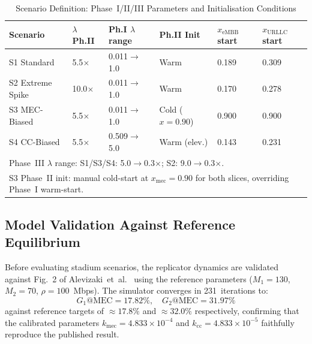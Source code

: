 \documentclass[conference]{IEEEtran}
\begin{document}
\begin{table}[ht]
\centering
\caption{Scenario Definition: Phase~I/II/III Parameters and Initialisation Conditions}
\label{tab:scenario_def}
\renewcommand{\arraystretch}{1.15}
\begin{tabular}{p{1.5cm}p{0.8cm}p{1.3cm}p{1.0cm}p{0.7cm}p{0.7cm}}
\toprule
\textbf{Scenario} & \textbf{$\lambda$ Ph.II} & \textbf{Ph.I $\lambda$ range} &
  \textbf{Ph.II Init} & \textbf{$x_\text{eMBB}$ start} & \textbf{$x_\text{URLLC}$ start} \\
\midrule
S1 Standard       & 5.5$\times$ & 0.011$\to$1.0 & Warm        & 0.189 & 0.309 \\
S2 Extreme Spike  & 10.0$\times$ & 0.011$\to$1.0 & Warm        & 0.170 & 0.278 \\
S3 MEC-Biased     & 5.5$\times$ & 0.011$\to$1.0 & Cold ($x\!=\!0.90$) & 0.900 & 0.900 \\
S4 CC-Biased      & 5.5$\times$ & 0.509$\to$5.0 & Warm (elev.) & 0.143 & 0.231 \\
\bottomrule
\multicolumn{6}{l}{\footnotesize Phase~III $\lambda$ range: S1/S3/S4: 5.0$\to$0.3$\times$;
  S2: 9.0$\to$0.3$\times$.} \\
\multicolumn{6}{l}{\footnotesize S3 Phase~II init: manual cold-start at $x_\text{mec}=0.90$
  for both slices, overriding Phase~I warm-start.} \\
\end{tabular}
\end{table}

\subsection{Model Validation Against Reference Equilibrium}

Before evaluating stadium scenarios, the replicator dynamics
are validated against Fig.~2 of Alevizaki~et~al.~\cite{Alevizaki2021upf}
using the reference parameters ($M_1=130$, $M_2=70$,
$\rho=100$~Mbps). The simulator converges in 231~iterations to:
\begin{equation*}
  G_1\text{@MEC} = 17.82\%,\quad G_2\text{@MEC} = 31.97\%
\end{equation*}
against reference targets of $\approx 17.8\%$ and $\approx 32.0\%$
respectively, confirming that the calibrated parameters
$k_\text{mec} = 4.833\times10^{-4}$ and $k_\text{cc} = 4.833\times10^{-5}$
faithfully reproduce the published result.
\end{document}
